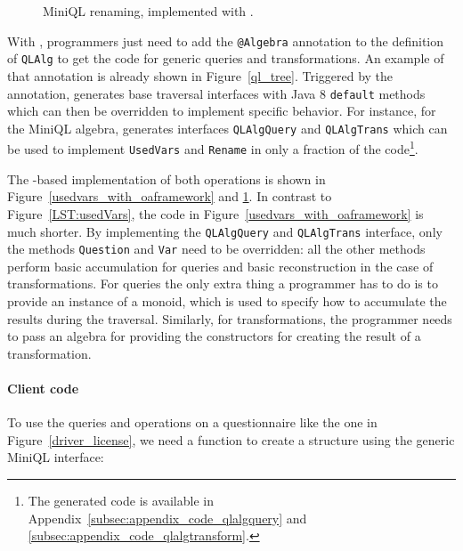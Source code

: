 \begin{figure}
\nocaptionrule
\caption{MiniQL renaming, implemented with  \Name.}
\label{rename_with_oaframework}
\end{figure}

With \Name, programmers just need to add the \lstinline{@Algebra} annotation
to the definition of \lstinline{QLAlg} to get the code for generic
queries and transformations. An example of that annotation is already
shown in Figure~\ref{ql_tree}.
Triggered by the annotation, \name generates base traversal interfaces with Java 8 \lstinline{default} methods which can then be overridden to implement specific behavior.
For instance, for the MiniQL algebra, \name generates interfaces
\lstinline{QLAlgQuery} and
\lstinline{QLAlgTrans} which can be used to implement \lstinline{UsedVars} and \lstinline{Rename} in only a fraction of the code\footnote{The generated code is available in Appendix~\ref{subsec:appendix_code_qlalgquery} and \ref{subsec:appendix_code_qlalgtransform}.}.

The \name-based implementation of both operations is shown in
Figure~\ref{usedvars_with_oaframework} and
\ref{rename_with_oaframework}. In contrast to Figure~\ref{LST:usedVars}, the
code in Figure~\ref{usedvars_with_oaframework} is much shorter.
By implementing the
\lstinline{QLAlgQuery} and \lstinline{QLAlgTrans} interface, only the
methods \lstinline{Question} and \lstinline{Var} need to be
overridden: all the other methods perform basic accumulation for
queries and basic reconstruction in the case of
transformations.  For queries the only extra thing a programmer
has to do is to provide an instance of a monoid, which is used to
specify how to accumulate the results during the traversal. Similarly,
for transformations, the programmer needs to pass an algebra for
providing the constructors for creating the result of a
transformation.

\paragraph{Client code}
To use the queries and operations on a questionnaire like the one in Figure~\ref{driver_license}, we need a function to create a structure using the generic MiniQL interface:


